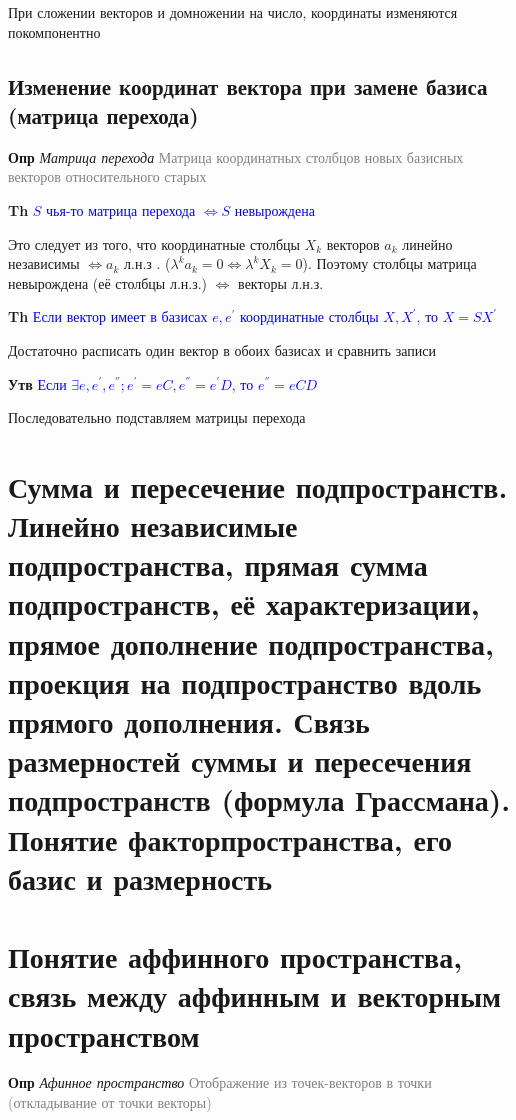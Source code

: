 \documentclass[a4paper, 14pt]{article}
\begin{document}
    При сложении векторов и домножении на число, координаты изменяются покомпонентно

    \subsection{Изменение координат вектора при замене базиса (матрица перехода)}

    \textbf{Опр} \textit{Матрица перехода} \textcolor{gray}{Матрица координатных столбцов новых базисных векторов
    относительного старых}

    \textbf{Th} \textcolor{blue}{$S$ чья-то матрица перехода $\Leftrightarrow S$ невырождена}

    Это следует из того, что координатные столбцы $X_k$ векторов $a_k$ линейно независимы $\Leftrightarrow a_k$ л.н.з
    . ($\lambda^k a_k = 0 \Leftrightarrow \lambda^k X_k = 0$).
    Поэтому столбцы матрица невырождена (её столбцы л.н.з.) $\Leftrightarrow$ векторы л.н.з.

    \textbf{Th} \textcolor{blue}{Если вектор имеет в базисах $e, e^{'}$ координатные столбцы $X, X^{'}$, то $X = SX^{'}$}

    Достаточно расписать один вектор в обоих базисах и сравнить записи

    \textbf{Утв} \textcolor{blue}{Если $\exists e, e^{'}, e^{''}; e^{'} = eC, e^{''} = e^{'}D$, то $e^{''} = eCD$}

    Последовательно подставляем матрицы перехода

    \section{Сумма и пересечение подпространств.
    Линейно независимые подпространства, прямая сумма подпространств, её характеризации, прямое дополнение
    подпространства, проекция на подпространство вдоль прямого дополнения.
    Связь размерностей суммы и пересечения подпространств (формула Грассмана).
    Понятие факторпространства, его базис и размерность}

    


    \section{Понятие аффинного пространства, связь между аффинным и векторным пространством}

    \textbf{Опр} \textit{Афинное пространство} \textcolor{gray}{Отображение из точек-векторов в точки (откладывание
    от точки векторы)}
\end{document}
